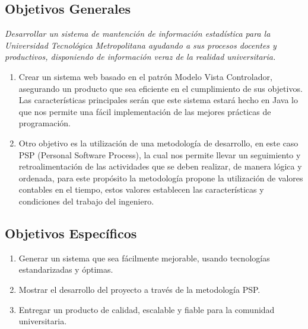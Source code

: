 \documentclass[a4paper,12pt,openany,oneside]{book}
\begin{document}
\subsection{Objetivos Generales}
\textit{Desarrollar un sistema de mantención de información estadística para la Universidad Tecnológica Metropolitana ayudando a sus procesos docentes y productivos, disponiendo de información veraz de la realidad universitaria.}
\begin{enumerate}
\item Crear un sistema web basado en el patrón Modelo Vista Controlador, asegurando un producto que sea eficiente en el cumplimiento de sus objetivos. Las características principales serán que este sistema estará hecho en Java lo que nos permite una fácil implementación de las mejores prácticas de programación.
\item Otro objetivo es la utilización de una metodología de desarrollo, en este caso PSP (Personal Software Process), la cual nos permite llevar un seguimiento y retroalimentación de las actividades que se deben realizar, de manera lógica y ordenada, para este propósito la metodología propone la utilización de valores contables en el tiempo, estos valores establecen las características y condiciones del trabajo del ingeniero.
\end{enumerate}
\subsection{Objetivos Específicos}
\begin{enumerate}
	\item Generar un sistema que sea fácilmente mejorable, usando tecnologías estandarizadas y óptimas.
	\item Mostrar el desarrollo del proyecto a través de la metodología PSP.
	\item Entregar un producto de calidad, escalable y fiable para la comunidad universitaria.
\end{enumerate}
\end{document}
